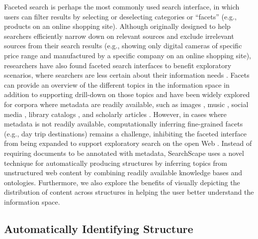 Faceted search is perhaps the most commonly used search interface, in which users can filter results by selecting or deselecting categories or ``facets'' (e.g., products on an online shopping site). Although originally designed to help searchers efficiently narrow down on relevant sources and exclude irrelevant sources from their search results (e.g., showing only digital cameras of specific price range and manufactured by a specific company on an online shopping site), researchers have also found faceted search interfaces to benefit exploratory scenarios, where searchers are less certain about their information needs \cite{hearst2002finding,yee2003faceted}. Facets can provide an  overview of the different topics in the information space in addition to supporting drill-down on those topics \cite{yee2003faceted,capra2008relation,kules2009exploratory} and have been widely explored for corpora where metadata are readily available, such as images \cite{yee2003faceted}, music \cite{wilson2006mspace}, social media \cite{o2010tweetmotif}, library catalogs \cite{marchionini2006towards,kules2009exploratory}, and scholarly articles \cite{hearst2009nlp,dork2012pivotpaths,klouche2015designing}. However, in cases where metadata is not readily available, computationally inferring fine-grained facets (e.g., day trip destinations) remains a challenge, inhibiting the faceted interface from being expanded to support exploratory search on the open Web \cite{bruce1999workplace,teevan2008challenges}. Instead of requiring documents to be annotated with metadata, SearchScape uses a novel technique for automatically producing structures by inferring topics from unstructured web content by combining readily available knowledge bases and ontologies. Furthermore, we also explore the benefits of visually depicting the distribution of content across structures in helping the user better understand the information space.


\subsection{Automatically Identifying Structure}

